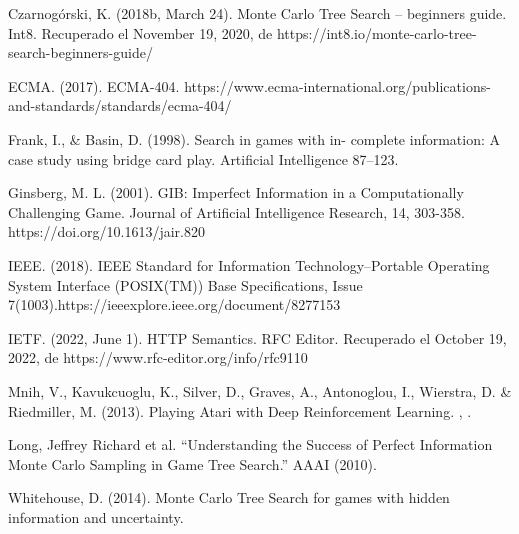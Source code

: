 \documentclass[11pt, oneside]{book}
\begin{document}
\begin{thebibliography}{111}
      Czarnogórski, K. (2018b, March 24). Monte Carlo Tree
      Search – beginners guide. Int8. Recuperado el November 19, 2020, de
      https://int8.io/monte-carlo-tree-search-beginners-guide/

      ECMA. (2017). ECMA-404.
      https://www.ecma-international.org/publications-and-standards/standards/ecma-404/

      Frank, I., \& Basin, D. (1998). Search in games with in-
      complete information: A case study using bridge card play. Artificial
      Intelligence 87–123.

      Ginsberg, M. L. (2001). GIB: Imperfect Information in
      a Computationally Challenging Game. Journal of Artificial Intelligence
      Research, 14, 303-358. https://doi.org/10.1613/jair.820

      IEEE. (2018). IEEE Standard for Information
      Technology--Portable Operating System Interface (POSIX(TM)) Base
      Specifications, Issue 7(1003).https://ieeexplore.ieee.org/document/8277153

      IETF. (2022, June 1). HTTP Semantics. RFC Editor.
      Recuperado el October 19, 2022, de https://www.rfc-editor.org/info/rfc9110


      Mnih, V., Kavukcuoglu, K., Silver, D., Graves, A.,
      Antonoglou, I., Wierstra, D. \& Riedmiller, M. (2013). Playing Atari with
      Deep Reinforcement Learning. , .

      Long, Jeffrey Richard et al. “Understanding the Success
      of Perfect Information Monte Carlo Sampling in Game Tree Search.” AAAI
      (2010).

      Whitehouse, D. (2014). Monte Carlo Tree Search for games with
      hidden information and uncertainty.











\end{thebibliography}
\end{document}
